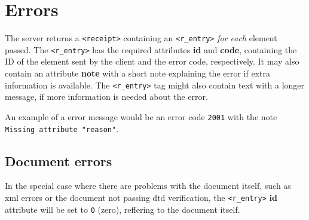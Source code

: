 \newpage
\section{Errors}
\label{sec:errors}

The server returns a \texttt{<receipt>} containing an \texttt{<r\_entry>}
\textit{for each} element passed. The \texttt{<r\_entry>} has the required
attributes \textbf{id} and \textbf{code}, containing the ID of the element sent
by the client and the error code, respectively. It may also contain an
attribute \textbf{note} with a short note explaining the error if extra
information is available. The \texttt{<r\_entry>} tag might also contain text
with a longer message, if more information is needed about the error. 

An example of a error message would be an error code \texttt{2001} with the
note \texttt{Missing attribute "reason"}.

\subsection{Document errors}

In the special case where there are problems with the document itself, such as
\gls{xml} errors or the document not passing \gls{dtd} verification, the
\texttt{<r\_entry>} \textbf{id} attribute will be set to \texttt{0} (zero),
reffering to the document itself. 
